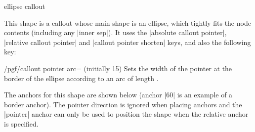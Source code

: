 \begin{shape}{ellipse callout}%
	
  This shape is a callout whose main shape is an ellipse, which
  tightly fits the node contents (including any |inner sep|).
  It uses the |absolute callout pointer|,
	|relative callout pointer| and |callout pointer shorten| keys, and
	also the following key:


\begin{key}{/pgf/callout pointer arc= (initially 15)}
  Sets the width of the pointer at the border of the ellipse according
  to an arc of length .
\end{key}
	
	
	The anchors for this shape are shown below (anchor |60| is an
	example of a border anchor). The pointer direction is ignored
	when placing anchors and the |pointer| anchor can only be
	used to position the shape when the relative anchor is
	specified.
	
\begin{codeexample}[]
\Huge
{}
\end{codeexample}

\end{shape}


